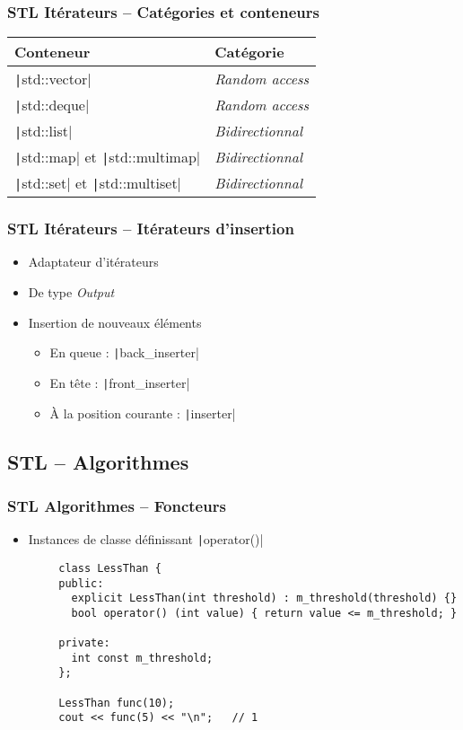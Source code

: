 \documentclass[C++.tex]{subfiles}
\begin{document}
\begin{frame}[fragile]
	\frametitle{STL Itérateurs -- Catégories et conteneurs}
	\begin{tabular}{ | p{5cm} | p{5cm} |}
		\hline
		Conteneur & Catégorie \\
		\hline
		\texttt|std::vector| & \textit{Random access} \\
		\hline
		\texttt|std::deque| & \textit{Random access} \\
		\hline
		\texttt|std::list| & \textit{Bidirectionnal} \\
		\hline
		\texttt|std::map| et \texttt|std::multimap| & \textit{Bidirectionnal} \\
		\hline
		\texttt|std::set| et \texttt|std::multiset| & \textit{Bidirectionnal} \\
		\hline
	\end{tabular}
\end{frame}

\begin{frame}[fragile]
	\frametitle{STL Itérateurs -- Itérateurs d'insertion}
	\begin{itemize}
		\item Adaptateur d'itérateurs
		\item De type \textit{Output}
		\item Insertion de nouveaux éléments
		\begin{itemize}
			\item En queue : \texttt|back_inserter|
			\item En tête : \texttt|front_inserter|
			\item À la position courante : \texttt|inserter|
		\end{itemize}
	\end{itemize}
\end{frame}

\subsection*{STL -- Algorithmes}
\begin{frame}[fragile]
	\frametitle{STL Algorithmes -- Foncteurs}
	\begin{itemize}
		\item Instances de classe définissant \texttt|operator()|
	\end{itemize}

	\begin{verbatim}
		class LessThan {
		public:
		  explicit LessThan(int threshold) : m_threshold(threshold) {}
		  bool operator() (int value) { return value <= m_threshold; }

		private:
		  int const m_threshold;
		};

		LessThan func(10);
		cout << func(5) << "\n";   // 1
	\end{verbatim}
\end{frame}
\end{document}
